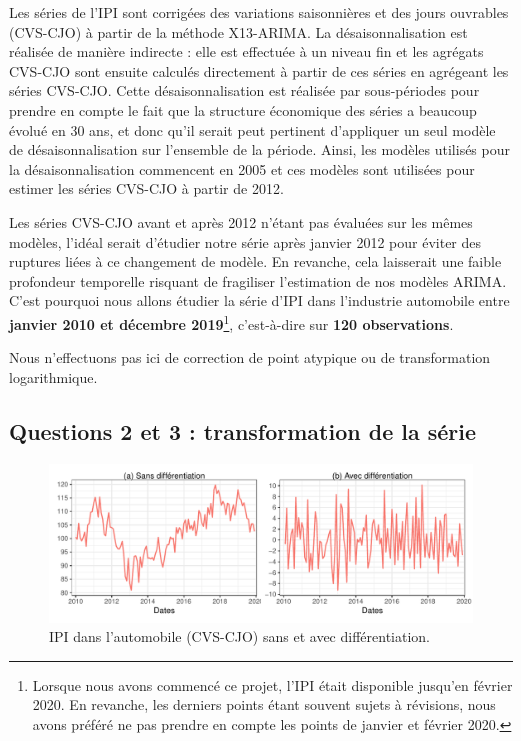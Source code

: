 \documentclass[french]{article}
\let\rmarkdownfootnote\footnote%
\def\footnote{\protect\rmarkdownfootnote}
\begin{document}
Les séries de l'IPI sont corrigées des variations saisonnières et des jours ouvrables (CVS-CJO) à partir de la méthode X13-ARIMA.
La désaisonnalisation est réalisée de manière indirecte : elle est effectuée à un niveau fin et les agrégats CVS-CJO sont ensuite calculés directement à partir de ces séries en agrégeant les séries CVS-CJO.
Cette désaisonnalisation est réalisée par sous-périodes pour prendre en compte le fait que la structure économique des séries a beaucoup évolué en 30 ans, et donc qu'il serait peut pertinent d'appliquer un seul modèle de désaisonnalisation sur l'ensemble de la période.
Ainsi, les modèles utilisés pour la désaisonnalisation commencent en 2005 et ces modèles sont utilisées pour estimer les séries CVS-CJO à partir de 2012.

Les séries CVS-CJO avant et après 2012 n'étant pas évaluées sur les mêmes modèles, l'idéal serait d'étudier notre série après janvier 2012 pour éviter des ruptures liées à ce changement de modèle. En revanche, cela laisserait une faible profondeur temporelle risquant de fragiliser l'estimation de nos modèles ARIMA.
C'est pourquoi nous allons étudier la série d'IPI dans l'industrie automobile entre \textbf{janvier 2010 et décembre 2019}\footnote{Lorsque nous avons commencé ce projet, l'IPI était disponible jusqu'en février 2020.
  En revanche, les derniers points étant souvent sujets à révisions, nous avons préféré ne pas prendre en compte les points de janvier et février 2020.}, c'est-à-dire sur \textbf{120 observations}.

Nous n'effectuons pas ici de correction de point atypique ou de transformation logarithmique.

\hypertarget{questions-2-et-3-transformation-de-la-suxe9rie}{%
\subsection{Questions 2 et 3 : transformation de la série}\label{questions-2-et-3-transformation-de-la-suxe9rie}}

\begin{figure}

{\centering \includegraphics{img/rmd-compGraph-1} 

}

\caption{IPI dans l'automobile (CVS-CJO) sans et avec différentiation.}\label{fig:compGraph}
\end{figure}
\end{document}

